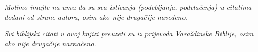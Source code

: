 \thispagestyle{empty}

\vspace*{1cm}

\begin{center}
    \textit{Molimo imajte na umu da su sva isticanja (podebljanja, podvlačenja) u citatima dodani od strane autora, osim ako nije drugačije navedeno.}
    
    \textit{Svi biblijski citati u ovoj knjizi preuzeti su iz prijevoda Varaždinske Biblije, osim ako nije drugačije naznačeno.}
\end{center}